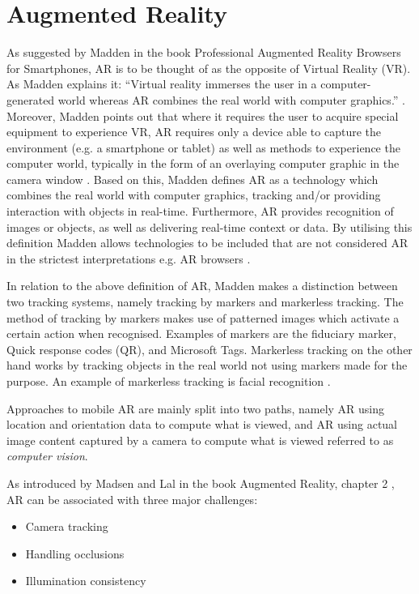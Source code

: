 \section{Augmented Reality}
As suggested by Madden in the book Professional Augmented Reality Browsers for Smartphones, AR is to be thought of as the opposite of Virtual Reality (VR). As Madden explains it: “Virtual reality immerses the user in a computer-generated world whereas AR combines the real world with computer graphics.” \cite{Madden2011}. Moreover, Madden points out that where it requires the user to acquire special equipment to experience VR, AR requires only a device able to capture the environment (e.g. a smartphone or tablet) as well as methods to experience the computer world, typically in the form of an overlaying computer graphic in the camera window \cite{Madden2011}. Based on this, Madden defines AR as a technology which combines the real world with computer graphics, tracking and/or providing interaction with objects in real-time. Furthermore, AR provides recognition of images or objects, as well as delivering real-time context or data. By utilising this definition Madden allows technologies to be included that are not considered AR in the strictest interpretations e.g. AR browsers \cite{Madden2011}.

In relation to the above definition of AR, Madden makes a distinction between two tracking systems, namely tracking by markers and markerless tracking. The method of tracking by markers makes use of patterned images which activate a certain action when recognised. Examples of markers are the fiduciary marker, Quick response codes (QR), and Microsoft Tags. Markerless tracking on the other hand works by tracking objects in the real world not using markers made for the purpose. An example of markerless tracking is facial recognition \cite{Madden2011}.

Approaches to mobile AR are mainly split into two paths, namely AR using location and orientation data to compute what is viewed, and AR using actual image content captured by a camera to compute what is viewed referred to as \textit{computer vision}.

As introduced by Madsen and Lal in the book Augmented Reality, chapter 2 \cite{Lal2010}, AR can be associated with three major challenges:

\begin{itemize}
\item Camera tracking 
\item Handling occlusions
\item Illumination consistency
\end{itemize}

